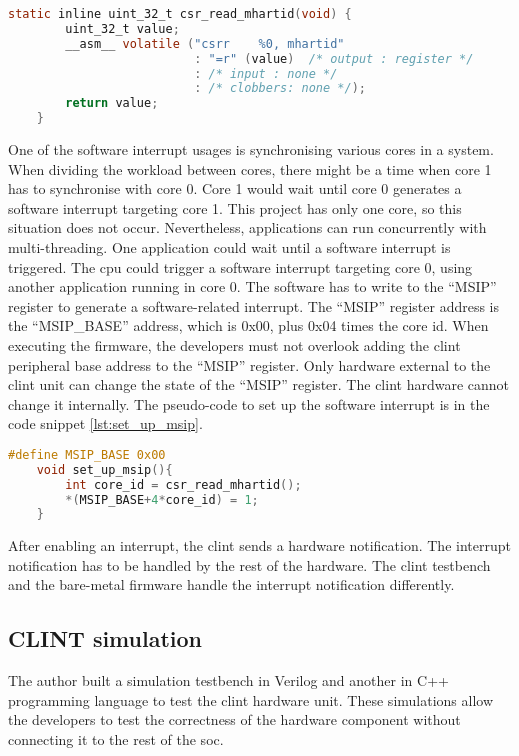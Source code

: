 \begin{lstlisting}[language=C, caption={Read core id from \acrshort{csr}.}, label=lst:read_mhartid]
    static inline uint_32_t csr_read_mhartid(void) {
        uint_32_t value;        
        __asm__ volatile ("csrr    %0, mhartid"
                          : "=r" (value)  /* output : register */
                          : /* input : none */
                          : /* clobbers: none */);
        return value;
    }
\end{lstlisting}

One of the software interrupt usages is synchronising various cores in a system. When dividing the workload between cores, there might be a time when core 1 has to synchronise with core 0. Core 1 would wait until core 0 generates a software interrupt targeting core 1. This project has only one core, so this situation does not occur. Nevertheless, applications can run concurrently with multi-threading. One application could wait until a software interrupt is triggered. The \acrshort{cpu} could trigger a software interrupt targeting core 0, using another application running in core 0. The software has to write to the \enquote{MSIP} register to generate a software-related interrupt. The \enquote{MSIP} register address is the \enquote{MSIP\_BASE} address, which is 0x00, plus 0x04 times the core id. When executing the firmware, the developers must not overlook adding the \acrshort{clint} peripheral base address to the \enquote{MSIP} register. Only hardware external to the \acrshort{clint} unit can change the state of the \enquote{MSIP} register. The \acrshort{clint} hardware cannot change it internally. The pseudo-code to set up the software interrupt is in the code snippet \ref*{lst:set_up_msip}.

\begin{lstlisting}[language=C, caption={Set Up Software Interrupt.}, label=lst:set_up_msip]
    #define MSIP_BASE 0x00
    void set_up_msip(){
        int core_id = csr_read_mhartid();
        *(MSIP_BASE+4*core_id) = 1;
    }
\end{lstlisting}

After enabling an interrupt, the \acrshort{clint} sends a hardware notification. The interrupt notification has to be handled by the rest of the hardware. The \acrshort{clint} testbench and the bare-metal firmware handle the interrupt notification differently.

\subsection{CLINT simulation}
The author built a simulation testbench in Verilog and another in C++ programming language to test the \acrshort{clint} hardware unit. These simulations allow the developers to test the correctness of the hardware component without connecting it to the rest of the \acrshort{soc}.

